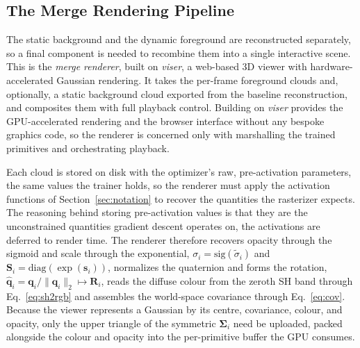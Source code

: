 \subsection{The Merge Rendering Pipeline}
\label{sec:merge}

The static background and the dynamic foreground are reconstructed separately, so a
final component is needed to recombine them into a single interactive scene. This is
the \emph{merge renderer}, built on \emph{viser}, a web-based 3D viewer with
hardware-accelerated Gaussian rendering. It takes the per-frame foreground clouds and,
optionally, a static background cloud exported from the baseline reconstruction, and
composites them with full playback control. Building on \emph{viser} provides the
GPU-accelerated rendering and the browser interface without any bespoke graphics code,
so the renderer is concerned only with marshalling the trained primitives and
orchestrating playback.

Each cloud is stored on
disk with the optimizer's raw, pre-activation parameters, the same values
the trainer holds, so the renderer must apply the activation functions of
Section~\ref{sec:notation} to recover the quantities the rasterizer expects. The
reasoning behind storing pre-activation values is that they are the unconstrained
quantities gradient descent operates on, the activations are deferred to render time.
The renderer therefore recovers opacity through the sigmoid and scale through the
exponential, $\sigma_i = \mathrm{sig}(\tilde\sigma_i)$ and $\mathbf{S}_i =
\mathrm{diag}(\exp(\mathbf{s}_i))$, normalizes the quaternion and forms the rotation,
$\hat{\mathbf{q}}_i = \mathbf{q}_i / \|\mathbf{q}_i\|_2 \mapsto \mathbf{R}_i$, reads the
diffuse colour from the zeroth SH band through Eq.~\eqref{eq:sh2rgb} and assembles the
world-space covariance through Eq.~\eqref{eq:cov}. Because the viewer represents a
Gaussian by its centre, covariance, colour, and opacity, only the upper triangle of
the symmetric $\boldsymbol{\Sigma}_i$ need be uploaded, packed alongside the colour and
opacity into the per-primitive buffer the GPU consumes.

